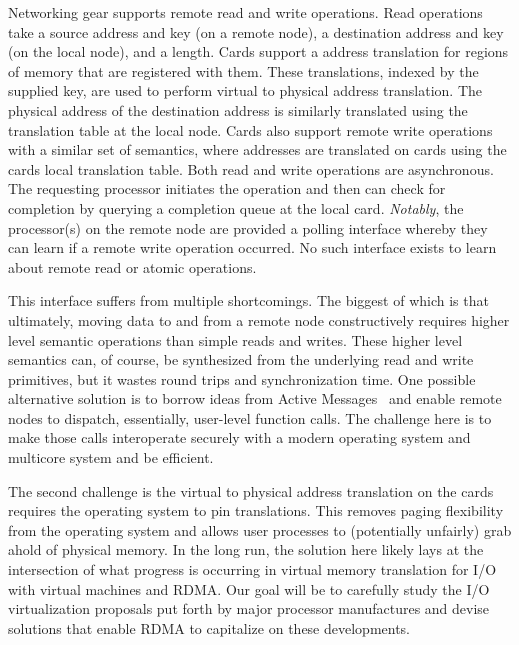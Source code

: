 Networking gear supports remote read and write operations.  Read operations take a source address and key (on a remote node), a destination address and key (on the local node), and a length.  Cards support a address translation for regions of memory that are registered with them.  These translations, indexed by the supplied key, are used to perform virtual to physical address translation.  The physical address of the destination address is similarly translated using the translation table at the local node.  Cards also support remote write operations with a similar set of semantics, where addresses are translated on cards using the cards local translation table.  Both read and write operations are asynchronous.  The requesting processor initiates the operation and then can check for completion by querying a completion queue at the local card.  \emph{Notably}, the processor(s) on the remote node are provided a polling interface whereby they can learn if a remote write operation occurred.  No such interface exists to learn about remote read or atomic operations.

This interface suffers from multiple shortcomings.  The biggest of which is that ultimately, moving data to and from a remote node constructively requires higher level semantic operations than simple reads and writes.  These higher level semantics can, of course, be synthesized from the underlying read and write primitives, but it wastes round trips and synchronization time.  One possible alternative solution is to borrow ideas from Active Messages~\cite{active-messages} and enable remote nodes to dispatch, essentially, user-level function calls.  The challenge here is to make those calls interoperate securely with a modern operating system and multicore system and be efficient.   

The second challenge is the virtual to physical address translation on the cards requires the operating system to pin translations.  This removes paging flexibility from the operating system and allows user processes to (potentially unfairly) grab ahold of physical memory.  In the long run, the solution here likely lays at the intersection of what progress is occurring in virtual memory translation for I/O with virtual machines and RDMA.  Our goal will be to carefully study the I/O virtualization proposals put forth by major processor manufactures and devise solutions that enable RDMA to capitalize on these developments.  

